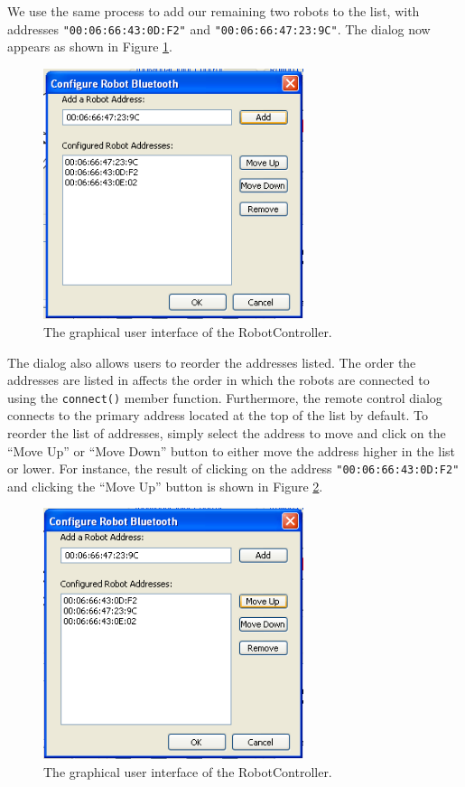 \documentclass{article}
\begin{document}
We use the same process to add our remaining two robots to the list,
with addresses \texttt{"00:06:66:43:0D:F2"} and 
\texttt{"00:06:66:47:23:9C"}. The dialog now appears as shown in
Figure \ref{fig:shot8.png}.

\begin{figure}[H]
\begin{center}
\includegraphics[width=3in]{images/shot8.png}
\end{center}
\caption{\label{fig:shot8.png} The graphical user interface of the RobotController.}
\end{figure}

The dialog also allows users to reorder the addresses listed. The
order the addresses are listed in affects the order in which the robots
are connected to using the \texttt{connect()} member function. Furthermore,
the remote control dialog connects to the primary address located at the
top of the list by default. To reorder the list of addresses, simply
select the address to move and click on the ``Move Up'' or ``Move Down''
button to either move the address higher in the list or lower. For instance,
the result of clicking on the address \texttt{"00:06:66:43:0D:F2"} and clicking
the ``Move Up'' button is shown in Figure \ref{fig:shot10.png}.

\begin{figure}[H]
\begin{center}
\includegraphics[width=3in]{images/shot10.png}
\end{center}
\caption{\label{fig:shot10.png} The graphical user interface of the RobotController.}
\end{figure}
\end{document}
